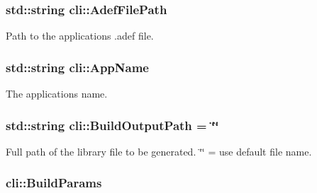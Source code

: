 \subsubsection[{\texorpdfstring{Adef\+File\+Path}{AdefFilePath}}]{\setlength{\rightskip}{0pt plus 5cm}std\+::string cli\+::\+Adef\+File\+Path\hspace{0.3cm}{\ttfamily [static]}}\hypertarget{namespacecli_a43080cfa6871e332b48e838134a09abb}{}\label{namespacecli_a43080cfa6871e332b48e838134a09abb}


Path to the application\textquotesingle{}s .adef file. 

\subsubsection[{\texorpdfstring{App\+Name}{AppName}}]{\setlength{\rightskip}{0pt plus 5cm}std\+::string cli\+::\+App\+Name\hspace{0.3cm}{\ttfamily [static]}}\hypertarget{namespacecli_a72f0db648f5dcb09bab38f233e78d511}{}\label{namespacecli_a72f0db648f5dcb09bab38f233e78d511}


The application\textquotesingle{}s name. 

\subsubsection[{\texorpdfstring{Build\+Output\+Path}{BuildOutputPath}}]{\setlength{\rightskip}{0pt plus 5cm}std\+::string cli\+::\+Build\+Output\+Path = \char`\"{}\char`\"{}}\hypertarget{namespacecli_aa5e0a473170e9417b3b9d5a2733b253e}{}\label{namespacecli_aa5e0a473170e9417b3b9d5a2733b253e}


Full path of the library file to be generated. \char`\"{}\char`\"{} = use default file name. 

\subsubsection[{\texorpdfstring{Build\+Params}{BuildParams}}]{ cli\+::\+Build\+Params\hspace{0.3cm}{\ttfamily [static]}}\hypertarget{namespacecli_a4b3f8be996a29096d321c822dd8a7521}{}\label{namespacecli_a4b3f8be996a29096d321c822dd8a7521}


